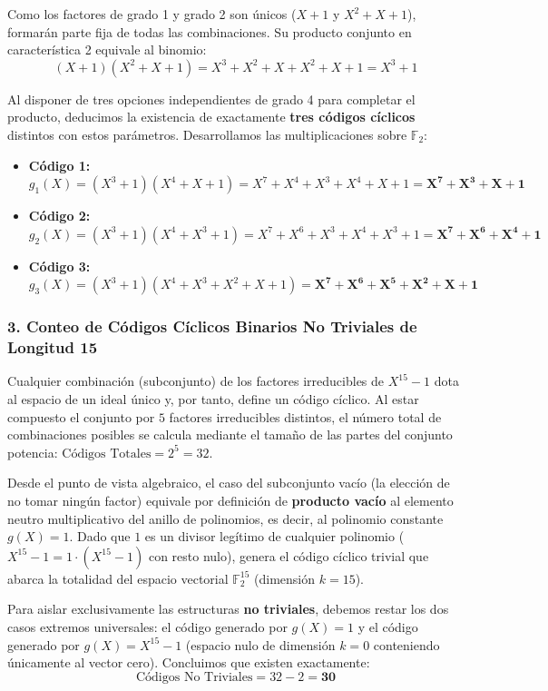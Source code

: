 \documentclass{article}
\begin{document}
Como los factores de grado 1 y grado 2 son únicos ($X+1$ y $X^2+X+1$), formarán parte fija de todas las combinaciones. Su producto conjunto en característica 2 equivale al binomio:
\[ (X + 1)(X^2 + X + 1) = X^3 + X^2 + X + X^2 + X + 1 = X^3 + 1 \]

Al disponer de tres opciones independientes de grado 4 para completar el producto, deducimos la existencia de exactamente \textbf{tres códigos cíclicos} distintos con estos parámetros. Desarrollamos las multiplicaciones sobre $\mathbb{F}_2$:
\begin{itemize}
    \item \textbf{Código 1:} $g_1(X) = (X^3 + 1)(X^4 + X + 1) = X^7 + X^4 + X^3 + X^4 + X + 1 = \mathbf{X^7 + X^3 + X + 1}$
    \item \textbf{Código 2:} $g_2(X) = (X^3 + 1)(X^4 + X^3 + 1) = X^7 + X^6 + X^3 + X^4 + X^3 + 1 = \mathbf{X^7 + X^6 + X^4 + 1}$
    \item \textbf{Código 3:} $g_3(X) = (X^3 + 1)(X^4 + X^3 + X^2 + X + 1) = \mathbf{X^7 + X^6 + X^5 + X^2 + X + 1}$
\end{itemize}

\subsubsection{3. Conteo de Códigos Cíclicos Binarios No Triviales de Longitud 15}
Cualquier combinación (subconjunto) de los factores irreducibles de $X^{15}-1$ dota al espacio de un ideal único y, por tanto, define un código cíclico. Al estar compuesto el conjunto por $5$ factores irreducibles distintos, el número total de combinaciones posibles se calcula mediante el tamaño de las partes del conjunto potencia: $\text{Códigos Totales} = 2^5 = 32$.

Desde el punto de vista algebraico, el caso del subconjunto vacío (la elección de no tomar ningún factor) equivale por definición de \textbf{producto vacío} al elemento neutro multiplicativo del anillo de polinomios, es decir, al polinomio constante \textbf{$g(X) = 1$}. Dado que $1$ es un divisor legítimo de cualquier polinomio ($X^{15}-1 = 1 \cdot (X^{15}-1)$ con resto nulo), genera el código cíclico trivial que abarca la totalidad del espacio vectorial $\mathbb{F}_2^{15}$ (dimensión $k=15$). 

Para aislar exclusivamente las estructuras \textbf{no triviales}, debemos restar los dos casos extremos universales: el código generado por $g(X)=1$ y el código generado por $g(X)=X^{15}-1$ (espacio nulo de dimensión $k=0$ conteniendo únicamente al vector cero). Concluimos que existen exactamente:
\[ \text{Códigos No Triviales} = 32 - 2 = \mathbf{30} \]
\end{document}
